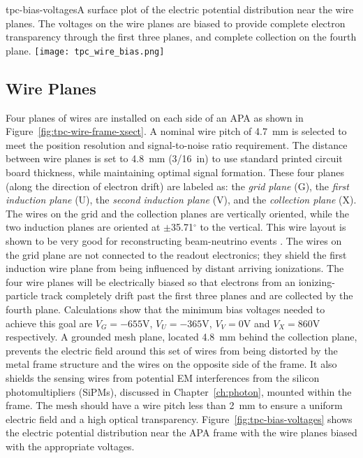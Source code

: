\begin{cdrfigure}{tpc-bias-voltages}{A surface plot of the electric potential distribution near the wire planes.  The voltages on the wire planes are biased to provide complete electron transparency through the first three planes, and complete collection on the fourth plane.}
\texttt{[image: tpc\_wire\_bias.png]}
\end{cdrfigure}


\subsection{Wire Planes}


Four planes of wires are installed on each side of an APA as shown in Figure~\ref{fig:tpc-wire-frame-xsect}.
A nominal wire pitch of 4.7~mm is selected to meet the position resolution  and signal-to-noise ratio requirement. The distance between wire planes is set to 4.8~mm (3/16~in) to use standard printed circuit board thickness, while maintaining optimal signal formation.  These four planes (along the direction of electron drift) are labeled as: the {\em grid plane} (G), the {\em first induction plane} (U), the {\em second induction plane} (V), and the {\em collection plane} (X).
The wires on the grid and the collection planes
are vertically oriented, while the two induction planes are oriented 
at $\pm$35.71$^\circ$ to the vertical. This wire layout is shown to be very good for reconstructing beam-neutrino events \cite{wire-orientation}. The wires on the grid plane are not 
connected to the readout electronics; they shield the first induction wire plane from being influenced by distant arriving ionizations. The four wire planes 
will be electrically biased so that electrons from an ionizing-particle
track completely drift past the first three planes and are collected by the 
fourth plane. Calculations show that the minimum bias voltages 
needed to achieve this goal are $V_G= -655$V, $V_U=-365$V, $V_V=0$V and $V_X=860$V 
respectively.  A grounded mesh plane, located 4.8~mm behind the collection plane, prevents the electric field around this set of wires from being distorted by the metal frame structure and the wires on the opposite side of the frame. It also shields the sensing wires from potential EM interferences from the silicon photomultipliers (SiPMs), discussed in Chapter~\ref{ch:photon}, mounted within the frame.  The mesh should have a wire pitch less than 2~mm to ensure a uniform electric field and a high optical transparency.  Figure~\ref{fig:tpc-bias-voltages} shows the electric potential distribution near the APA frame with the wire planes biased with the appropriate voltages. 

